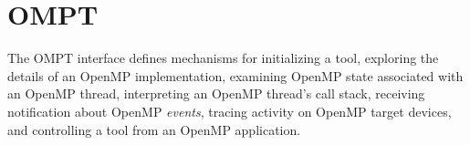 %
%
%
%
%
%
%
%
%
%
%
%
%


\section{OMPT}
\label{sec:ompt-overview}

The OMPT interface defines mechanisms for initializing a tool,
exploring the details of an OpenMP implementation, examining OpenMP state
associated with an OpenMP thread, interpreting an OpenMP thread's call stack,
receiving notification about OpenMP \emph{events}, tracing activity on 
OpenMP target devices, and controlling a tool from an OpenMP application.

